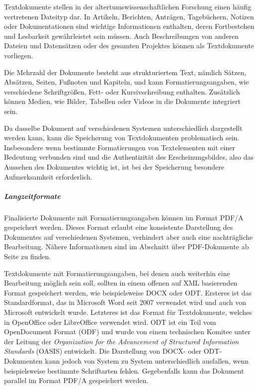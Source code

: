 Textdokumente stellen in der altertumswissenschaftlichen Forschung einen häufig vertretenen Dateityp dar. In Artikeln, Berichten, Anträgen, Tagebüchern, Notizen oder Dokumentationen sind wichtige Informationen enthalten, deren Fortbestehen und Lesbarkeit gewährleistet sein müssen. Auch Beschreibungen von anderen Dateien und Datensätzen oder des gesamten Projektes können als Textdokumente vorliegen.

Die Mehrzahl der Dokumente besteht aus strukturiertem Text, nämlich Sätzen, Absätzen, Seiten, Fußnoten und Kapiteln, und kann Formatierungsangaben, wie verschiedene Schriftgrößen, Fett- oder Kursivschreibung enthalten. Zusätzlich können Medien, wie Bilder, Tabellen oder Videos in die Dokumente integriert sein. 

Da dasselbe Dokument auf verschiedenen Systemen unterschiedlich dargestellt werden kann, kann die Speicherung von Textdokumenten problematisch sein. Insbesondere wenn bestimmte Formatierungen von Textelementen mit einer Bedeutung verbunden sind und die Authentizität des Erscheinungsbildes, also das Aussehen des Dokumentes wichtig ist, ist bei der Speicherung besondere Aufmerksamkeit erforderlich.


\subparagraph{Langzeitformate} Finalisierte Dokumente mit Formatierungsangaben können im Format PDF/A gespeichert werden. Dieses Format erlaubt eine konsistente Darstellung des Dokumentes auf verschiedenen Systemen, verhindert aber auch eine nachträgliche Bearbeitung. Nähere Informationen sind im Abschnitt über PDF-Dokumente ab Seite \pageref{pdf-dokumente} zu finden.

Textdokumente mit Formatierungsangaben, bei denen auch weiterhin eine Bearbeitung möglich sein soll, sollten in einem offenen auf XML basierenden Format gespeichert werden, wie beispielsweise DOCX oder ODT. Ersteres ist das Standardformat, das in Microsoft Word seit 2007 verwendet wird und auch von Microsoft entwickelt wurde. Letzteres ist das Format für Textdokumente, welches in OpenOffice oder LibreOffice verwendet wird. ODT ist ein Teil vom OpenDocument Format (ODF) und wurde von einem technischen Komitee unter der Leitung der \emph{Organization for the Advancement of Structured Information Standards} (OASIS) entwickelt. Die Darstellung von DOCX- oder ODT-Dokumenten kann jedoch von System zu System unterschiedlich ausfallen, wenn beispielsweise bestimmte Schriftarten fehlen. Gegebenfalls kann das Dokument parallel im Format PDF/A gespeichert werden. 

